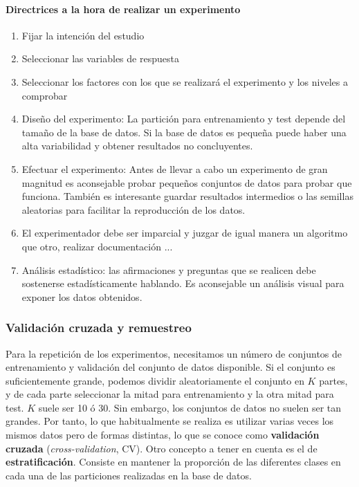 \paragraph{Directrices a la hora de realizar un experimento}
	\begin{enumerate}
	\item Fijar la intención del estudio
	\item Seleccionar las variables de respuesta
	\item Seleccionar los factores con los que se realizará el experimento y los niveles a comprobar
	\item Diseño del experimento: La partición para entrenamiento y test depende del tamaño de la base de datos. Si la base de datos es pequeña puede haber una alta variabilidad y obtener resultados no concluyentes.
	\item Efectuar el experimento: Antes de llevar a cabo un experimento de gran magnitud es aconsejable probar pequeños conjuntos de datos para probar que funciona. También es interesante guardar resultados intermedios o las semillas aleatorias para facilitar la reproducción de los datos.
	\item El experimentador debe ser imparcial y juzgar de igual manera un algoritmo que otro, realizar documentación ...
	\item Análisis estadístico: las afirmaciones y preguntas que se realicen debe sostenerse estadísticamente hablando. Es aconsejable un análisis visual para exponer los datos obtenidos.
	\end{enumerate}
	
	
\subsubsection{Validación cruzada y remuestreo}
	
	Para la repetición de los experimentos, necesitamos un número de conjuntos de entrenamiento y validación del conjunto de datos disponible. Si el conjunto es suficientemente grande, podemos dividir aleatoriamente el conjunto en $K$ partes, y de cada parte seleccionar la mitad para entrenamiento y la otra mitad para test. $K$ suele ser 10 ó 30. Sin embargo, los conjuntos de datos no suelen ser tan grandes. Por tanto, lo que habitualmente se realiza es utilizar varias veces los mismos datos pero de formas distintas, lo que se conoce como \textbf{validación cruzada} (\textit{cross-validation}, CV). Otro concepto a tener en cuenta es el de \textbf{estratificación}. Consiste en mantener la proporción de las diferentes clases en cada una de las particiones realizadas en la base de datos. 
	

